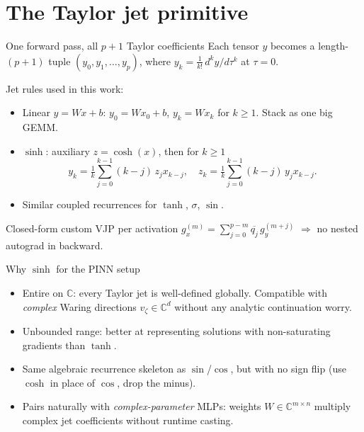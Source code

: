 \documentclass[10pt,aspectratio=169]{beamer}
\newcommand{\C}{\mathbb{C}}
\begin{document}
\section{The Taylor jet primitive}

\begin{frame}{One forward pass, all $p+1$ Taylor coefficients}
  Each tensor $y$ becomes a length-$(p+1)$ tuple $(y_0,y_1,\dots,y_p)$, where
  $y_k = \tfrac{1}{k!}\,d^k y/d\tau^k$ at $\tau=0$.

  \medskip
  Jet rules used in this work:

  \begin{itemize}
    \item \alert{Linear $y=Wx+b$:}\;
      $y_0 = Wx_0 + b$,\;
      $y_k = Wx_k$ for $k\ge1$.\;
      Stack as one big GEMM.

    \item \alert{$\sinh$:}\; auxiliary $z = \cosh(x)$, then for $k\ge 1$
    \[
      y_k = \tfrac1k\!\sum_{j=0}^{k-1}(k{-}j)\,z_j x_{k-j},\quad
      z_k = \tfrac1k\!\sum_{j=0}^{k-1}(k{-}j)\,y_j x_{k-j}.
    \]

    \item Similar coupled recurrences for $\tanh$, $\sigma$, $\sin$.
  \end{itemize}

  \medskip
  Closed-form custom VJP per activation
  $g_x^{(m)} = \sum_{j=0}^{p-m}\overline{q_j}\,g_y^{(m+j)}$
  $\Rightarrow$ no nested autograd in backward.
\end{frame}

\begin{frame}{Why $\sinh$ for the PINN setup}
  \begin{itemize}
    \item Entire on $\C$: every Taylor jet is well-defined globally.
          Compatible with \emph{complex} Waring directions $v_\zeta\in\C^d$
          without any analytic continuation worry.
    \item Unbounded range: better at representing solutions with
          non-saturating gradients than $\tanh$.
    \item Same algebraic recurrence skeleton as $\sin$/$\cos$, but with no
          sign flip (use $\cosh$ in place of $\cos$, drop the minus).
    \item Pairs naturally with \emph{complex-parameter} MLPs:
          weights $W\in\C^{m\times n}$ multiply complex jet coefficients
          without runtime casting.
  \end{itemize}
\end{frame}
\end{document}
